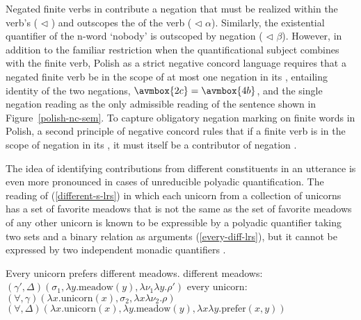 \documentclass[output=paper
	        ,collection
	        ,collectionchapter
 	        ,biblatex
                ,babelshorthands
                ,newtxmath
                ,draftmode
                ,colorlinks, citecolor=brown
]{langscibook}
\begin{document}
Negated finite verbs in  contribute a negation that must be realized
within the verb's  ( $\triangleleft$ ) and
outscopes the  of the verb ( $\triangleleft$ $\alpha$).
Similarly, the existential quantifier of the n-word  `nobody' is
outscoped by negation ( $\triangleleft$ $\beta$). However, in addition
to the familiar restriction when the quantificational subject combines
with the finite verb, Polish as a strict negative concord language requires
that a negated finite verb be in the scope of at most one negation in
its , entailing identity of the two negations,
$\avmbox{2c}=\avmbox{4b}$, and the single negation reading  as
the only admissible reading of the sentence shown in Figure~\ref{polish-nc-sem}.
To capture obligatory negation marking on finite words in Polish, a second
principle of negative concord rules that if a finite verb is in the scope
of negation in its , it must itself be a contributor of negation \citep[316]{RichterandSailer2001}.

The idea of identifying contributions from different constituents in
an utterance is even more pronounced in cases of unreducible polyadic
quantification. The reading of (\ref{different-s-lrs}) in which each
unicorn from a collection of unicorns has a set of favorite meadows that
is not the same as the set of favorite meadows of any other unicorn is known
to be expressible by a polyadic quantifier taking two sets and a binary
relation as arguments (\ref{every-diff-lrs}), but it cannot be expressed by
two independent monadic quantifiers \citep{Keenan1992b}.


\begin{exe}
\ex\label{different-lrs}
\begin{xlist}
\ex\label{different-s-lrs} Every unicorn prefers different meadows.
\ex \label{different-meadows-lrs}
different meadows: \hspace{0.18cm} $(\gamma', \Delta)(\sigma_1, \lambda y.\text{meadow}(y), \lambda \nu_1\lambda y.\rho')$
\ex \label{every-unicorn-lrs}
every unicorn: \hspace{0.95cm}$(\forall, \gamma)(\lambda x.\text{unicorn}(x), \sigma_2, \lambda x\lambda \nu_2.\rho)$
\ex \label{every-diff-lrs}
$(\forall, \Delta)(\lambda x.\text{unicorn}(x), \lambda y.\text{meadow}(y), \lambda x\lambda y.\text{prefer}(x,y))$
\end{xlist}
\end{exe}
\end{document}

